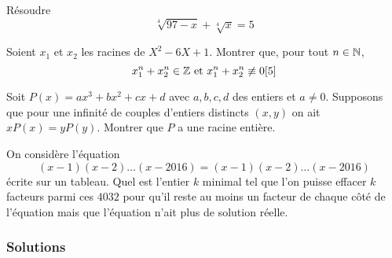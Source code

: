 \begin{exo}[M-D]
Résoudre
$$\sqrt[4]{97-x} + \sqrt[4]{x} = 5$$
\end{exo}


\begin{exo}[M]
Soient $x_1$ et $x_2$ les racines de $X^2-6X+1$. Montrer que, pour tout $n\in \mathbb N$,
$$x_1^n+x_2^n\in \mathbb Z \text{ et } x_1^n+x_2^n\not\equiv 0[5]$$
\end{exo}




\begin{exo}[SL IMO 2002, A3, D]
Soit $P(x)=ax^3+bx^2+cx+d$ avec $a,b,c,d$ des entiers et $a\ne 0$. Supposons que pour une infinité de couples d'entiers distincts $(x,y)$ on ait $xP(x)=yP(y)$. Montrer que $P$ a une racine entière.
\end{exo}


\begin{exo}[IMO 2016 P5]
On considère l'équation
$$(x-1)(x-2)\dots(x-2016)=(x-1)(x-2)\dots(x-2016) $$
écrite sur un tableau. Quel est l'entier $k$ minimal tel que l'on puisse effacer $k$ facteurs parmi ces $4032$ pour qu'il reste au moins un facteur de chaque côté de l'équation mais que l'équation n'ait plus de solution réelle.
\end{exo}


\subsubsection{Solutions}


